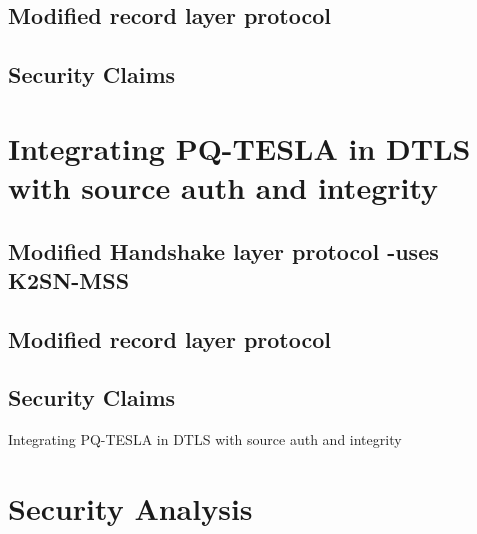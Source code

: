     
    
\subsection{Modified record layer protocol}

\subsection{Security Claims}




\section{Integrating PQ-TESLA in DTLS with source auth and integrity}


\subsection{Modified Handshake layer protocol -uses K2SN-MSS}
\subsection{Modified record layer protocol}
\subsection{Security Claims}
Integrating PQ-TESLA in DTLS with source auth and integrity


\section{Security Analysis}